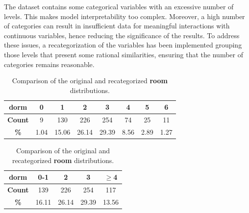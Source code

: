 \documentclass[11pt]{report} %
\begin{document}
The dataset contains some categorical variables with an excessive number of levels. This makes model interpretability too complex. Moreover, a high number of categories can result in insufficient data for meaningful interactions with continuous variables, hence reducing the significance of the results. To address these issues, a recategorization of the variables has been implemented grouping those levels that present some rational similarities, ensuring that the number of categories remains reasonable. 

\begin{table}[H]
    \centering
    \begin{minipage}{0.35\textwidth}
        \centering
        \begin{tabular}{cccccccc}
            \toprule
            \textbf{dorm} & \textbf{0} & \textbf{1} & \textbf{2} & \textbf{3} & \textbf{4} & \textbf{5} & \textbf{6} \\ 
            \midrule
            \textbf{Count}       & 9      & 130    & 226    & 254    & 74     & 25     & 11     \\
            \textbf{\%}  & 1.04 & 15.06 & 26.14 & 29.39 & 8.56 & 2.89 & 1.27  \\ 
            \bottomrule
        \end{tabular}
    \end{minipage}
    \hfill
    \begin{minipage}{0.35\textwidth}
        \centering
        \begin{tabular}{ccccc}
            \toprule
            \textbf{dorm} & \textbf{0-1} & \textbf{2} & \textbf{3} & \textbf{$\geq$4} \\ 
            \midrule
            \textbf{Count}       & 139    & 226    & 254    & 117     \\ 
            \textbf{\%}  & 16.11 & 26.14 & 29.39 & 13.56 \\ 
            \bottomrule
        \end{tabular}
    \end{minipage}
    \caption{Comparison of the original and recategorized \textbf{room} distributions.}
    \label{tab:side_by_side_room_distribution}
\end{table}
\end{document}
